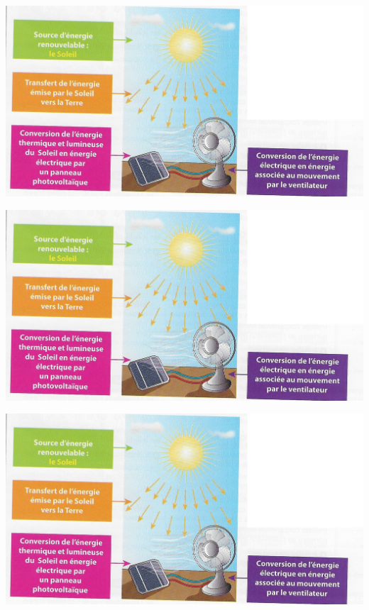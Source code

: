 \documentclass[12pt,a4paper]{article}
\begin{document}
\begin{center}
	\includegraphics[scale=0.8]{conversion}
\end{center}

\begin{center}
	\includegraphics[scale=0.8]{conversion}
\end{center}

\begin{center}
	\includegraphics[scale=0.8]{conversion}
\end{center}
\end{document}
